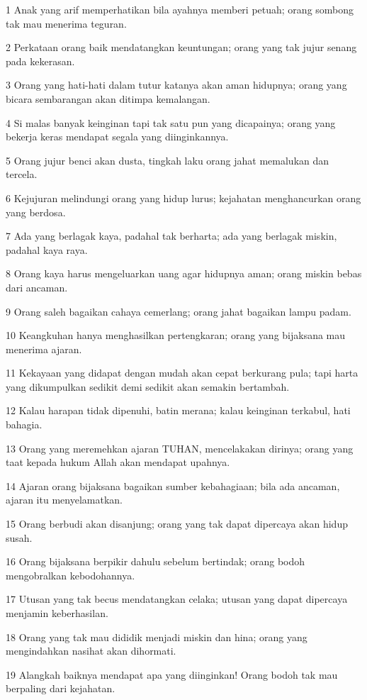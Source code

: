 \par 1 Anak yang arif memperhatikan bila ayahnya memberi petuah; orang sombong tak mau menerima teguran.
\par 2 Perkataan orang baik mendatangkan keuntungan; orang yang tak jujur senang pada kekerasan.
\par 3 Orang yang hati-hati dalam tutur katanya akan aman hidupnya; orang yang bicara sembarangan akan ditimpa kemalangan.
\par 4 Si malas banyak keinginan tapi tak satu pun yang dicapainya; orang yang bekerja keras mendapat segala yang diinginkannya.
\par 5 Orang jujur benci akan dusta, tingkah laku orang jahat memalukan dan tercela.
\par 6 Kejujuran melindungi orang yang hidup lurus; kejahatan menghancurkan orang yang berdosa.
\par 7 Ada yang berlagak kaya, padahal tak berharta; ada yang berlagak miskin, padahal kaya raya.
\par 8 Orang kaya harus mengeluarkan uang agar hidupnya aman; orang miskin bebas dari ancaman.
\par 9 Orang saleh bagaikan cahaya cemerlang; orang jahat bagaikan lampu padam.
\par 10 Keangkuhan hanya menghasilkan pertengkaran; orang yang bijaksana mau menerima ajaran.
\par 11 Kekayaan yang didapat dengan mudah akan cepat berkurang pula; tapi harta yang dikumpulkan sedikit demi sedikit akan semakin bertambah.
\par 12 Kalau harapan tidak dipenuhi, batin merana; kalau keinginan terkabul, hati bahagia.
\par 13 Orang yang meremehkan ajaran TUHAN, mencelakakan dirinya; orang yang taat kepada hukum Allah akan mendapat upahnya.
\par 14 Ajaran orang bijaksana bagaikan sumber kebahagiaan; bila ada ancaman, ajaran itu menyelamatkan.
\par 15 Orang berbudi akan disanjung; orang yang tak dapat dipercaya akan hidup susah.
\par 16 Orang bijaksana berpikir dahulu sebelum bertindak; orang bodoh mengobralkan kebodohannya.
\par 17 Utusan yang tak becus mendatangkan celaka; utusan yang dapat dipercaya menjamin keberhasilan.
\par 18 Orang yang tak mau dididik menjadi miskin dan hina; orang yang mengindahkan nasihat akan dihormati.
\par 19 Alangkah baiknya mendapat apa yang diinginkan! Orang bodoh tak mau berpaling dari kejahatan.
